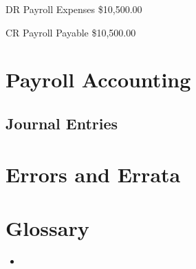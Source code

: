 \documentclass[letterpaper,10pt,english]{sphinxmanual}
\begin{document}
\begin{DUlineblock}{0em}
\item[] DR    Payroll Expenses    \$10,500.00
\item[]
\begin{DUlineblock}{\DUlineblockindent}
\item[] CR  Payroll Payable   \$10,500.00
\end{DUlineblock}
\end{DUlineblock}

\sphinxstepscope


\chapter{Payroll Accounting}
\label{\detokenize{payroll_accounting:payroll-accounting}}\label{\detokenize{payroll_accounting::doc}}

\section{Journal Entries}
\label{\detokenize{payroll_accounting:journal-entries}}
\sphinxstepscope


\chapter{Errors and Errata}
\label{\detokenize{errata:errors-and-errata}}\label{\detokenize{errata::doc}}

\chapter{Glossary}
\label{\detokenize{index:glossary}}\begin{itemize}
\item {} 
\sphinxAtStartPar
{}

\end{itemize}



\renewcommand{\indexname}{Index}
\printindex
\end{document}
